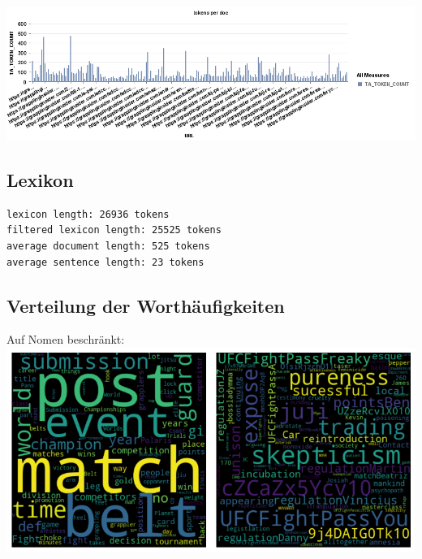 \includegraphics[width=\textwidth]{images/tokens_per_doc.png}

\subsection{Lexikon}

{\color{MidnightBlue}
\begin{lstlisting}
lexicon length: 26936 tokens
filtered lexicon length: 25525 tokens
average document length: 525 tokens
average sentence length: 23 tokens
\end{lstlisting}}

\subsection{Verteilung der Worthäufigkeiten}

\noindent Auf Nomen beschränkt: \\

\includegraphics[width=0.5\textwidth]{images/top_100_wordcloud.png}\includegraphics[width=0.5\textwidth]{images/bottom_100_wordcloud.png} \\

